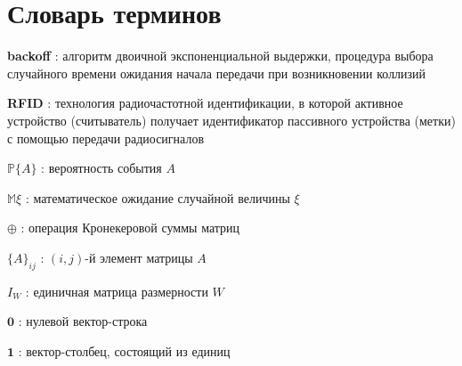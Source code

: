 \chapter*{Словарь терминов}             %



\textbf{backoff} : алгоритм двоичной экспоненциальной выдержки, процедура выбора случайного времени ожидания начала передачи при возникновении коллизий

\textbf{RFID} : технология радиочастотной идентификации, в которой активное устройство (считыватель) получает идентификатор пассивного устройства (метки) с помощью передачи радиосигналов

$\mathbb{P}\{A\}$ : вероятность события $A$

$\mathbb{M}\xi$ : математическое ожидание случайной величины $\xi$

$\oplus$ : операция Кронекеровой суммы матриц

$\{A\}_{ij}$ : $(i,j)$-й элемент матрицы $A$

$I_W$ : единичная матрица размерности $W$

$\mathbf{0}$ : нулевой вектор-строка

$\mathbf{1}$ : вектор-столбец, состоящий из единиц